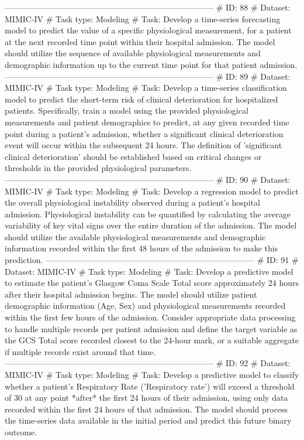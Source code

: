 \begin{tcolorbox}[colback=cadmiumgreen!5!white,colframe=forestgreen!75!white,breakable,title=\textit{Generated analytical tasks in task 4.}]
\begin{VerbatimWrap}
-----------------------------------------------------------------------------
# ID: 88  
# Dataset: MIMIC-IV 
# Task type: Modeling
# Task: Develop a time-series forecasting model to predict the value of a specific physiological measurement, for a patient at the next recorded time point within their hospital admission. The model should utilize the sequence of available physiological measurements and demographic information up to the current time point for that patient admission.
-----------------------------------------------------------------------------
# ID: 89  
# Dataset: MIMIC-IV 
# Task type: Modeling
# Task: Develop a time-series classification model to predict the short-term risk of clinical deterioration for hospitalized patients. Specifically, train a model using the provided physiological measurements and patient demographics to predict, at any given recorded time point during a patient's admission, whether a significant clinical deterioration event will occur within the subsequent 24 hours. The definition of 'significant clinical deterioration' should be established based on critical changes or thresholds in the provided physiological parameters.
-----------------------------------------------------------------------------
# ID: 90  
# Dataset: MIMIC-IV 
# Task type: Modeling
# Task: Develop a regression model to predict the overall physiological instability observed during a patient's hospital admission. Physiological instability can be quantified by calculating the average variability of key vital signs over the entire duration of the admission. The model should utilize the available physiological measurements and demographic information recorded within the first 48 hours of the admission to make this prediction.
-----------------------------------------------------------------------------
# ID: 91  
# Dataset: MIMIC-IV 
# Task type: Modeling
# Task: Develop a predictive model to estimate the patient's Glasgow Coma Scale Total score approximately 24 hours after their hospital admission begins. The model should utilize patient demographic information (Age, Sex) and physiological measurements recorded within the first few hours of the admission. Consider appropriate data processing to handle multiple records per patient admission and define the target variable as the GCS Total score recorded closest to the 24-hour mark, or a suitable aggregate if multiple records exist around that time.
-----------------------------------------------------------------------------
# ID: 92  
# Dataset: MIMIC-IV 
# Task type: Modeling
# Task: Develop a predictive model to classify whether a patient's Respiratory Rate ('Respiratory rate') will exceed a threshold of 30 at any point *after* the first 24 hours of their admission, using only data recorded within the first 24 hours of that admission. The model should process the time-series data available in the initial period and predict this future binary outcome.

\end{VerbatimWrap}
\end{tcolorbox}
